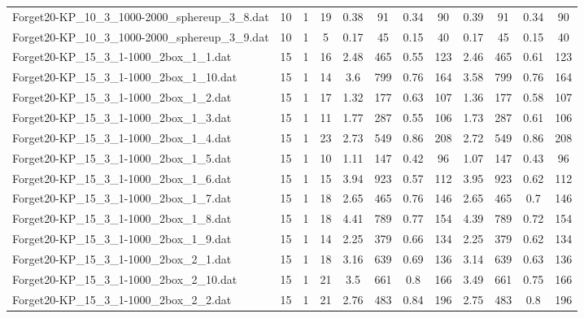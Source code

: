 \begin{sidewaystable}[!ht]
{\begin{tabular}{lccccccccccc}
Forget20-KP\_10\_3\_1000-2000\_sphereup\_3\_8.dat & 10 & 1 & 19 & 0.38 & 91 &  \textcolor{blue2}{0.34} & 90 & 0.39 & 91 &  \textcolor{blue2}{0.34} & 90 \\
Forget20-KP\_10\_3\_1000-2000\_sphereup\_3\_9.dat & 10 & 1 & 5 & 0.17 & 45 &  \textcolor{blue2}{0.15} & 40 & 0.17 & 45 &  \textcolor{blue2}{0.15} & 40 \\
Forget20-KP\_15\_3\_1-1000\_2box\_1\_1.dat & 15 & 1 & 16 & 2.48 & 465 &  \textcolor{blue2}{0.55} & 123 & 2.46 & 465 & 0.61 & 123 \\
Forget20-KP\_15\_3\_1-1000\_2box\_1\_10.dat & 15 & 1 & 14 & 3.6 & 799 &  \textcolor{blue2}{0.76} & 164 & 3.58 & 799 &  \textcolor{blue2}{0.76} & 164 \\
Forget20-KP\_15\_3\_1-1000\_2box\_1\_2.dat & 15 & 1 & 17 & 1.32 & 177 & 0.63 & 107 & 1.36 & 177 &  \textcolor{blue2}{0.58} & 107 \\
Forget20-KP\_15\_3\_1-1000\_2box\_1\_3.dat & 15 & 1 & 11 & 1.77 & 287 &  \textcolor{blue2}{0.55} & 106 & 1.73 & 287 & 0.61 & 106 \\
Forget20-KP\_15\_3\_1-1000\_2box\_1\_4.dat & 15 & 1 & 23 & 2.73 & 549 &  \textcolor{blue2}{0.86} & 208 & 2.72 & 549 &  \textcolor{blue2}{0.86} & 208 \\
Forget20-KP\_15\_3\_1-1000\_2box\_1\_5.dat & 15 & 1 & 10 & 1.11 & 147 &  \textcolor{blue2}{0.42} & 96 & 1.07 & 147 & 0.43 & 96 \\
Forget20-KP\_15\_3\_1-1000\_2box\_1\_6.dat & 15 & 1 & 15 & 3.94 & 923 &  \textcolor{blue2}{0.57} & 112 & 3.95 & 923 & 0.62 & 112 \\
Forget20-KP\_15\_3\_1-1000\_2box\_1\_7.dat & 15 & 1 & 18 & 2.65 & 465 & 0.76 & 146 & 2.65 & 465 &  \textcolor{blue2}{0.7} & 146 \\
Forget20-KP\_15\_3\_1-1000\_2box\_1\_8.dat & 15 & 1 & 18 & 4.41 & 789 & 0.77 & 154 & 4.39 & 789 &  \textcolor{blue2}{0.72} & 154 \\
Forget20-KP\_15\_3\_1-1000\_2box\_1\_9.dat & 15 & 1 & 14 & 2.25 & 379 & 0.66 & 134 & 2.25 & 379 & 0.62 & 134 \\
Forget20-KP\_15\_3\_1-1000\_2box\_2\_1.dat & 15 & 1 & 18 & 3.16 & 639 & 0.69 & 136 & 3.14 & 639 & 0.63 & 136 \\
Forget20-KP\_15\_3\_1-1000\_2box\_2\_10.dat & 15 & 1 & 21 & 3.5 & 661 & 0.8 & 166 & 3.49 & 661 &  \textcolor{blue2}{0.75} & 166 \\
Forget20-KP\_15\_3\_1-1000\_2box\_2\_2.dat & 15 & 1 & 21 & 2.76 & 483 & 0.84 & 196 & 2.75 & 483 & 0.8 & 196 \\

\end{tabular}}
\end{sidewaystable}
